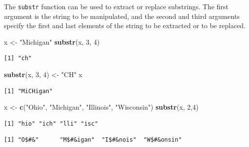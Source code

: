 \documentclass[
]{krantz}
\makeatletter
\newenvironment{Shaded}{\begin{snugshade}}{\end{snugshade}}
\newcommand{\DecValTok}[1]{\textcolor[rgb]{0.06,0.06,0.06}{#1}}
\newcommand{\KeywordTok}[1]{\textcolor[rgb]{0.27,0.27,0.27}{\textbf{#1}}}
\newcommand{\NormalTok}[1]{#1}
\newcommand{\StringTok}[1]{\textcolor[rgb]{0.5,0.5,0.5}{#1}}
\newenvironment{kframe}{%
\medskip{}
\setlength{\fboxsep}{.8em}
 \def\at@end@of@kframe{}%
 \ifinner\ifhmode%
  \def\at@end@of@kframe{\end{minipage}}%
  \begin{minipage}{\columnwidth}%
 \fi\fi%
 \def\FrameCommand##1{\hskip\@totalleftmargin \hskip-\fboxsep
 \colorbox{shadecolor}{##1}\hskip-\fboxsep
     \hskip-\linewidth \hskip-\@totalleftmargin \hskip\columnwidth}%
 \MakeFramed {\advance\hsize-\width
   \@totalleftmargin\z@ \linewidth\hsize
   \@setminipage}}%
 {\par\unskip\endMakeFramed%
 \at@end@of@kframe}
\renewenvironment{Shaded}{\begin{kframe}}{\end{kframe}}
\makeatother
\begin{document}
The \texttt{substr} function can be used to extract or replace substrings. The first argument is the string to be manipulated, and the second and third arguments specify the first and last elements of the string to be extracted or to be replaced.

\begin{Shaded}
\begin{Highlighting}[]
\NormalTok{x \textless{}{-}}\StringTok{ "Michigan"}
\KeywordTok{substr}\NormalTok{(x, }\DecValTok{3}\NormalTok{, }\DecValTok{4}\NormalTok{)}
\end{Highlighting}
\end{Shaded}

\begin{verbatim}
[1] "ch"
\end{verbatim}

\begin{Shaded}
\begin{Highlighting}[]
\KeywordTok{substr}\NormalTok{(x, }\DecValTok{3}\NormalTok{, }\DecValTok{4}\NormalTok{) \textless{}{-}}\StringTok{ "CH"}
\NormalTok{x}
\end{Highlighting}
\end{Shaded}

\begin{verbatim}
[1] "MiCHigan"
\end{verbatim}

\begin{Shaded}
\begin{Highlighting}[]
\NormalTok{x \textless{}{-}}\StringTok{ }\KeywordTok{c}\NormalTok{(}\StringTok{"Ohio"}\NormalTok{, }\StringTok{"Michigan"}\NormalTok{, }\StringTok{"Illinois"}\NormalTok{, }\StringTok{"Wisconsin"}\NormalTok{)}
\KeywordTok{substr}\NormalTok{(x, }\DecValTok{2}\NormalTok{,}\DecValTok{4}\NormalTok{)}
\end{Highlighting}
\end{Shaded}

\begin{verbatim}
[1] "hio" "ich" "lli" "isc"
\end{verbatim}

\begin{Shaded}
\end{Shaded}

\begin{verbatim}
[1] "O$#&"      "M$#&igan"  "I$#&nois"  "W$#&onsin"
\end{verbatim}
\end{document}
